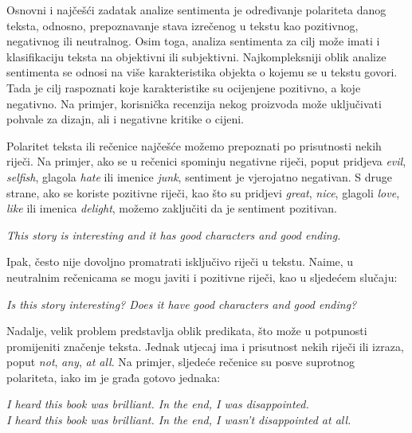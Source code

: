 \documentclass[a4paper,twoside,12pt]{memoir} %
\newcommand{\ti}[1]{\textit{#1\/}}
\begin{document}
	Osnovni i najčešći zadatak analize sentimenta je određivanje polariteta danog teksta, odnosno, prepoznavanje stava izrečenog u tekstu kao pozitivnog, negativnog ili neutralnog. Osim toga, analiza sentimenta za cilj može imati i klasifikaciju teksta na objektivni ili subjektivni. Najkompleksniji oblik analize sentimenta se odnosi na više karakteristika objekta o kojemu se u tekstu govori. Tada je cilj raspoznati koje karakteristike su ocijenjene pozitivno, a koje negativno. Na primjer, korisnička recenzija nekog proizvoda može uključivati pohvale za dizajn, ali i negativne kritike o cijeni.

	\bigskip

	Polaritet teksta ili rečenice najčešće možemo prepoznati po prisutnosti nekih riječi. Na primjer, ako se u rečenici spominju negativne riječi, poput pridjeva \ti{evil}, \ti{selfish}, glagola \ti{hate} ili imenice \ti{junk}, sentiment je vjerojatno negativan. S druge strane, ako se koriste pozitivne riječi, kao što su pridjevi \ti{great}, \ti{nice}, glagoli \ti{love}, \ti{like} ili imenica \ti{delight}, možemo zaključiti da je sentiment pozitivan.

	\begin{displayquote}
		\ti{This story is interesting and it has good characters and good ending.}
	\end{displayquote}

	Ipak, često nije dovoljno promatrati isključivo riječi u tekstu. Naime, u neutralnim rečenicama se mogu javiti i pozitivne riječi, kao u sljedećem slučaju:
	\begin{displayquote}
		\ti{Is this story interesting? Does it have good characters and good ending?}
	\end{displayquote}

	Nadalje, velik problem predstavlja oblik predikata, što može u potpunosti promijeniti značenje teksta. Jednak utjecaj ima i prisutnost nekih riječi ili izraza, poput \ti{not}, \ti{any}, \ti{at all}. Na primjer, sljedeće rečenice su posve suprotnog polariteta, iako im je građa gotovo jednaka:
	\begin{displayquote}
		\ti{I heard this book was brilliant. In the end, I was disappointed.}\\
		\ti{I heard this book was brilliant. In the end, I wasn't disappointed at all.}
	\end{displayquote}
\end{document}
